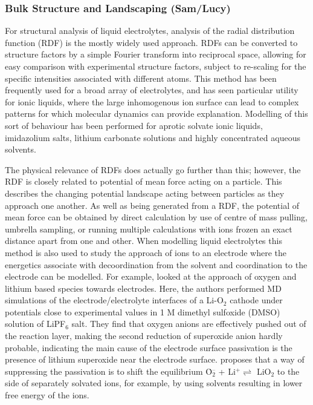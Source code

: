 \documentclass[../main.tex]{subfiles}
\begin{document}
\subsubsection{Bulk Structure and Landscaping (Sam/Lucy)}
For structural analysis of liquid electrolytes, analysis of the radial distribution function (RDF) is the mostly widely used approach. RDFs can be converted to structure factors by a simple Fourier transform into reciprocal space, allowing for easy comparison with experimental structure factors\cite{shimizu_structural_2015, pethes_comparison_2017, hanke_intermolecular_2001,tsuzuki_molecular_2009}, subject to re-scaling for the specific intensities associated with different atoms. This method has been frequently used for a broad array of electrolytes, and has seen particular utility for ionic liquids, where the large inhomogenous ion surface can lead to complex patterns for which molecular dynamics can provide explanation. Modelling of this sort of behaviour has been performed for aprotic\cite{Migliorati_2015} solvate ionic liquids\cite{shimizu_structural_2015}, imidazolium salts\cite{hanke_intermolecular_2001}, lithium carbonate solutions\cite{Chaudhari_2018} and highly concentrated aqueous solvents\cite{pethes_comparison_2017}.

The physical relevance of RDFs does actually go further than this; however, the RDF is closely related to potential of mean force acting on a particle. This describes the changing potential landscape acting between particles as they approach one another\cite{frenkel_understanding_2002}. As well as being generated from a RDF, the potential of mean force can be obtained by direct calculation by use of centre of mass pulling, umbrella sampling\cite{lindahl_gromacs_2021}, or running multiple calculations with ions frozen an exact distance apart from one and other. When modelling liquid electrolytes this method is also used to study the approach of ions to an electrode where the energetics associate with decoordination from the solvent and coordination to the electrode can be modelled. For example, \citeauthor{sergeev_electrodeelectrolyte_2017} looked at the approach of oxygen and lithium based species towards electrodes\cite{sergeev_electrodeelectrolyte_2017}. Here, the authors performed MD simulations of the electrode/electrolyte interfaces of a Li-O$_2$ cathode under potentials close to experimental values in 1 M dimethyl sulfoxide (DMSO) solution of LiPF$_6$ salt. They find that oxygen anions are effectively pushed out of the reaction layer, making the second reduction of superoxide anion hardly probable, indicating the main cause of the electrode surface passivation is the presence of lithium superoxide near the electrode surface. \citeauthor{sergeev_electrodeelectrolyte_2017} proposes that a way of suppressing the passivation is to shift the equilibrium \.{O}$_{2}^{–}$ + Li$^+ \rightleftharpoons$ LiO$_2$ to the side of separately solvated ions, for example, by using solvents resulting in lower free energy of the ions. \cite{sergeev_electrodeelectrolyte_2017}
\end{document}
